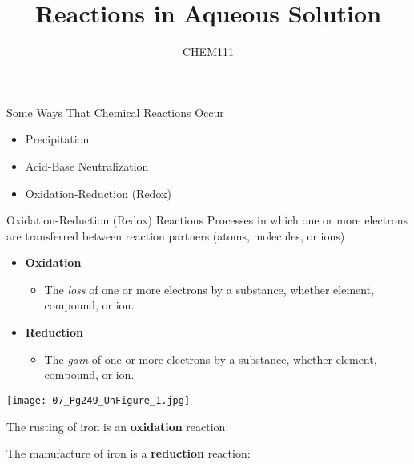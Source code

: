 \documentclass[handout]{beamer}
\title[Chapter 7.01-05]{Reactions in Aqueous Solution}
\author{CHEM111}
\begin{document}
\frame{\titlepage}

\begin{frame}{Some Ways That Chemical Reactions Occur}
	\begin{itemize}
		\item Precipitation
		\item Acid-Base Neutralization
		\item Oxidation-Reduction (Redox)
	\end{itemize}
\end{frame}

\begin{frame}[allowframebreaks]{Oxidation-Reduction (Redox) Reactions}
	Processes in which one or more electrons are transferred between
	reaction partners (atoms, molecules, or ions)

	\begin{center}
	\end{center}

	\framebreak

	\begin{itemize}
		\item \textbf{Oxidation}
			\begin{itemize}
				\item The \emph{loss} of one or more electrons
					by a substance, whether element,
					compound, or ion.
			\end{itemize}
		\item \textbf{Reduction}
			\begin{itemize}
				\item The \emph{gain} of one or more electrons
					by a substance, whether element,
					compound, or ion.
			\end{itemize}
	\end{itemize}

	\begin{center}
		\texttt{[image: 07\_Pg249\_UnFigure\_1.jpg]}
	\end{center}

	\framebreak

	The rusting of iron is an \textbf{oxidation} reaction:

	\begin{center}
	\end{center}

	The manufacture of iron is a \textbf{reduction} reaction:

	\begin{center}
	\end{center}
\end{frame}
\end{document}
